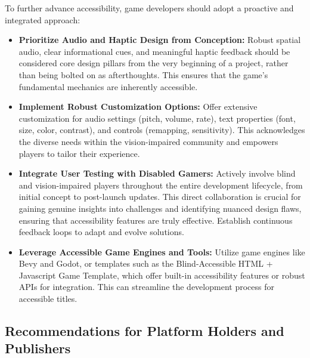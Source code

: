 To further advance accessibility, game developers should adopt a proactive and integrated approach:
\begin{itemize}
    \item \textbf{Prioritize Audio and Haptic Design from Conception:} Robust spatial audio, clear informational cues, and meaningful haptic feedback should be considered core design pillars from the very beginning of a project, rather than being bolted on as afterthoughts\supercite{LighthouseGuild2025}. This ensures that the game's fundamental mechanics are inherently accessible.
    \item \textbf{Implement Robust Customization Options:} Offer extensive customization for audio settings (pitch, volume, rate), text properties (font, size, color, contrast), and controls (remapping, sensitivity)\supercite{Wayline2025}. This acknowledges the diverse needs within the vision-impaired community and empowers players to tailor their experience.
    \item \textbf{Integrate User Testing with Disabled Gamers:} Actively involve blind and vision-impaired players throughout the entire development lifecycle, from initial concept to post-launch updates\supercite{Wayline2025}. This direct collaboration is crucial for gaining genuine insights into challenges and identifying nuanced design flaws, ensuring that accessibility features are truly effective. Establish continuous feedback loops to adapt and evolve solutions.
    \item \textbf{Leverage Accessible Game Engines and Tools:} Utilize game engines like Bevy and Godot, or templates such as the Blind-Accessible HTML + Javascript Game Template, which offer built-in accessibility features or robust APIs for integration\supercite{GitHubGameEngines}. This can streamline the development process for accessible titles.
\end{itemize}

\subsection{Recommendations for Platform Holders and Publishers}

